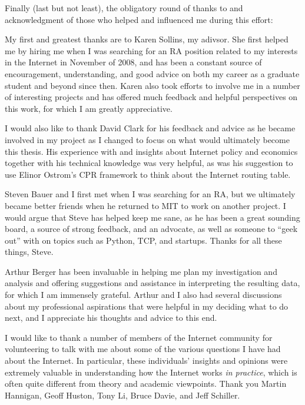 
\vspace{1em}

Finally (last but not least), the obligatory round of thanks to and
acknowledgment of those who helped and influenced me during this effort:

My first and greatest thanks are to Karen Sollins, my adivsor. She first helped
me by hiring me when I was searching for an RA position related to my interests
in the Internet in November of 2008, and has been a constant source of
encouragement, understanding, and good advice on both my career as a graduate
student and beyond since then. Karen also took efforts to involve me in a
number of interesting projects and has offered much feedback and helpful
perspectives on this work, for which I am greatly appreciative.

I would also like to thank David Clark for his feedback and advice as he became
involved in my project as I changed to focus on what would ultimately become
this thesis. His experience with and insights about Internet policy and
economics together with his technical knowledge was very helpful, as was his
suggestion to use Elinor Ostrom's CPR framework to think about the Internet
routing table.

Steven Bauer and I first met when I was searching for an RA, but we ultimately
became better friends when he returned to MIT to work on another project. I
would argue that Steve has helped keep me sane, as he has been a great sounding
board, a source of strong feedback, and an advocate, as well as someone to
``geek out'' with on topics such as Python, TCP, and startups. Thanks for all
these things, Steve.

Arthur Berger has been invaluable in helping me plan my investigation and
analysis and offering suggestions and assistance in interpreting the resulting
data, for which I am immensely grateful. Arthur and I also had several
discussions about my professional aspirations that were helpful in my deciding
what to do next, and I appreciate his thoughts and advice to this end.

I would like to thank a number of members of the Internet community for
volunteering to talk with me about some of the various questions I have had
about the Internet. In particular, these individuals' insights and opinions
were extremely valuable in understanding how the Internet works \emph{in
practice}, which is often quite different from theory and academic viewpoints.
Thank you Martin Hannigan, Geoff Huston, Tony Li, Bruce Davie, and Jeff
Schiller.

